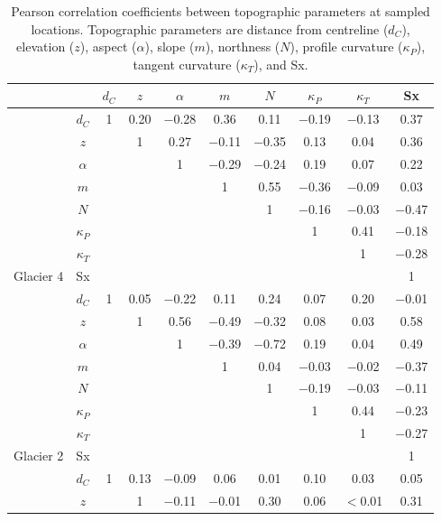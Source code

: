 \documentclass[12pt]{article}
\newcommand{\params}{Topographic parameters are distance from centreline ($d_C$), elevation ($z$), aspect ($\alpha$), slope ($m$), northness ($N$), profile curvature ($\kappa_P$), tangent curvature ($\kappa_T$), and Sx. }
\begin{document}
\begin{table}[H]
\centering
\caption{Pearson correlation coefficients between topographic parameters at sampled locations. \params}
\label{tab:pearson_correlation}
\begin{tabular}{cc|cccccccc}
 &  & $d_C$ & $z$ & $\alpha$ & $m$ & $N$ & $\kappa_P$ & $\kappa_T$ & Sx \\ \hline
 
 & $d_C$ & 1 & 0.20 &  $-$0.28 & 0.36 & 0.11 &  $-$0.19 &  $-$0.13 & 0.37 \\
 
 & $z$ & & 1 & 0.27 &  $-$0.11 &  $-$0.35 & 0.13 & 0.04 & 0.36 \\
 
 & $\alpha$ & & & 1 &  $-$0.29 &  $-$0.24 & 0.19 & 0.07 & 0.22 \\
 
 & $m$ & & & & 1 & 0.55 &  $-$0.36 &  $-$0.09 & 0.03 \\
 
 & $N$ & & & & & 1 &  $-$0.16 &  $-$0.03 &  $-$0.47 \\
 
 & $\kappa_P$ & & & & & & 1 & 0.41 &  $-$0.18 \\
 
 & $\kappa_T$ & & & & & & & 1 &  $-$0.28 \\
 
\multirow{ -8}{*}{Glacier 4} & Sx & & & & & & & & 1 \\ \hline
 & $d_C$ & 1 & 0.05 &  $-$0.22 & 0.11 & 0.24 & 0.07 & 0.20 &  $-$0.01 \\
 & $z$ & & 1 & 0.56 &  $-$0.49 &  $-$0.32 & 0.08 & 0.03 & 0.58 \\
 & $\alpha$ & & & 1 &  $-$0.39 &  $-$0.72 & 0.19 & 0.04 & 0.49 \\
 & $m$ & & & & 1 & 0.04 &  $-$0.03 &  $-$0.02 &  $-$0.37 \\
 & $N$ & & & & & 1 &  $-$0.19 &  $-$0.03 &  $-$0.11 \\
 & $\kappa_P$ & & & & & & 1 & 0.44 &  $-$0.23 \\
 & $\kappa_T$ & & & & & & & 1 &  $-$0.27 \\
\multirow{ -8}{*}{Glacier 2} & Sx & & & & & & & & 1 \\ \hline
 
 & $d_C$ & 1 & 0.13 &  $-$0.09 & 0.06 & 0.01 & 0.10 & 0.03 & 0.05 \\
 
 & $z$ & & 1 &  $-$0.11 &  $-$0.01 & 0.30 & 0.06 &  $<$0.01 & 0.31 \\
 

\end{tabular}
\end{table}
\end{document}
